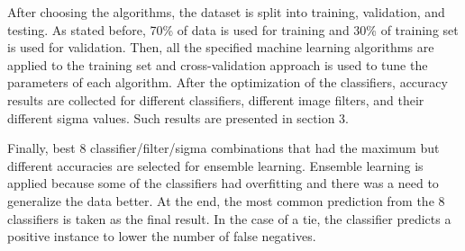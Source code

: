 \documentclass[conference]{IEEEtran}
\begin{document}
After choosing the algorithms, the dataset is split into training, validation, and testing. As stated before, 70\% of data is used for training and 30\% of training set is used for validation. Then, all the specified machine learning algorithms are applied to the training set and cross-validation approach is used to tune the parameters of each algorithm. After the optimization of the classifiers, accuracy results are collected for different classifiers, different image filters, and their different sigma values. Such results are presented in section 3. 

Finally, best 8 classifier/filter/sigma combinations that had the maximum but different accuracies are selected for ensemble learning. Ensemble learning is applied because some of the classifiers had overfitting and there was a need to generalize the data better. At the end, the most common prediction from the 8 classifiers is taken as the final result. In the case of a tie, the classifier predicts a positive instance to lower the number of false negatives.
\end{document}
